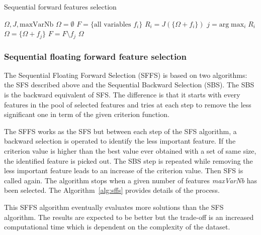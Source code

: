 \documentclass[journal]{IEEEtran}
\begin{document}
        \begin{algorithm}
        \caption{Sequential forward features selection\label{alg:sfs}}
        {\footnotesize
        \begin{algorithmic}[1]
        \REQUIRE $\Omega,J,\text{maxVarNb}$
        \STATE $\Omega=\emptyset$
        \STATE $F=\text{\{all variables $f_i$\}}$
        \STATE $R_i = J(\{\Omega + f_i\})$
        \ENDFOR
        \STATE $j=\text{arg} \max_{i} R_i$
        \STATE $\Omega = \{\Omega + f_j\}$
        \STATE $F = F \setminus f_j$
        \ENDWHILE
        \RETURN $\Omega$
        \end{algorithmic}
        }
        \end{algorithm}

        \subsubsection{Sequential floating forward feature selection}
        \label{sec:floating-presentation}

        The Sequential Floating Forward Selection (SFFS)\cite{somol1999adaptive} is based on two algorithms: the SFS described above and the Sequential Backward Selection (SBS). The SBS is the backward equivalent of SFS. The difference is that it starts with every features in the pool of selected features and tries at each step to remove the less significant one in term of the given criterion function.

        The SFFS works as the SFS but between each step of the SFS algorithm, a backward selection is operated to identify the less important feature. If the criterion value is higher than the best value ever obtained with a set of same size, the identified feature is picked out. The SBS step is repeated while removing the less important feature leads to an increase of the criterion value. Then SFS is called again. The algorithm stops when a given number of features \emph{maxVarNb} has been selected. The Algorithm~\ref{alg:sffs} provides details of the process.

        This SFFS algorithm eventually evaluates more solutions than the SFS algorithm. The results are expected to be better but the trade-off is an increased computational time which is dependent on the complexity of the dataset.
\end{document}
